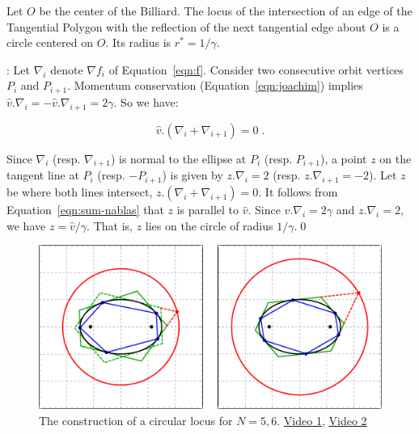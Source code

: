 \begin{theorem}
Let $O$ be the center of the Billiard. The locus of the intersection of an edge of the Tangential Polygon with the reflection of the next tangential edge about $O$ is a circle centered on $O$. Its radius is $r^*=1/\gamma$.
\end{theorem}

 \cite{sergei19_private_circles}: Let $\nabla_i$ denote $\nabla{f_i}$ of Equation~\ref{eqn:f}. Consider two consecutive orbit vertices $P_{i}$ and $P_{i+1}$. Momentum conservation (Equation~\ref{eqn:joachim}) implies $\hat{v}.\nabla_i= -\hat{v}.\nabla_{i+1}=2\gamma$. So we have:

\begin{equation}
    \hat{v}.\left(\nabla_i+ \nabla_{i+1}\right)=0\;.
    \label{eqn:sum-nablas}
\end{equation}

\noindent Since $\nabla_i$ (resp. $\nabla_{i+1}$) is normal to the ellipse at $P_{i}$ (resp. $P_{i+1}$), a point $z$ on the tangent line at $P_i$ (resp. $-P_{i+1}$) is given by $z.\nabla_i=2$ (resp. $z.\nabla_{i+1}=-2$). Let $z$ be where both lines intersect, $z.\left(\nabla_i+\nabla_{i+1}\right)=0$. It follows from Equation~\ref{eqn:sum-nablas} that $z$ is parallel to $\hat{v}$. Since $\hat{v}.\nabla_i=2\gamma$ and $z.\nabla_i=2$, we have $z = \hat{v}/\gamma$. That is, $z$ lies on the circle of radius $1/\gamma$.\qed

\begin{figure}[H]
    \centering
        \includegraphics[width=\textwidth]{pics/u0180_circ_grid.pdf}
    \caption{The construction of a circular locus for $N=5,6$.
    \href{https://youtu.be/dINE4aH1cvk}{Video 1},
    \href{https://youtu.be/EFeINGIDFrg}{Video 2} \cite[pl\#20,21]{dsr_math_intell_playlist}}
    \label{fig:gen-circ-grid}
\end{figure}
